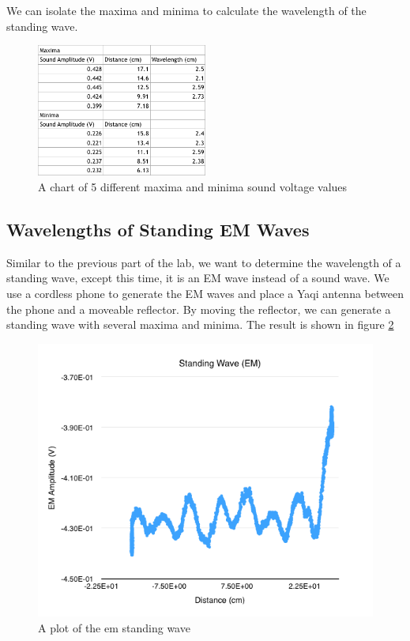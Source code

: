 \documentclass{article}
\begin{document}
We can isolate the maxima and minima to calculate the wavelength of the standing
wave.

\begin{figure}[H]
    \centering
    \includegraphics[width=0.5\textwidth]{charts/sound_wavelength}
    \caption{A chart of 5 different maxima and minima sound voltage values}
    \label{sound_wavelength}
\end{figure}

\subsection{Wavelengths of Standing EM Waves}

Similar to the previous part of the lab, we want to determine the wavelength of
a standing wave, except this time, it is an EM wave instead of a sound wave. We
use a cordless phone to generate the EM waves and place a Yaqi antenna between
the phone and a moveable reflector. By moving the reflector, we can generate a
standing wave with several maxima and minima. The result is shown in figure
\ref{standingwave_em}

\begin{figure}[H]
    \centering
    \includegraphics[width=\textwidth]{charts/standingwave_em}
    \caption{A plot of the em standing wave}
    \label{standingwave_em}
\end{figure}
\end{document}
